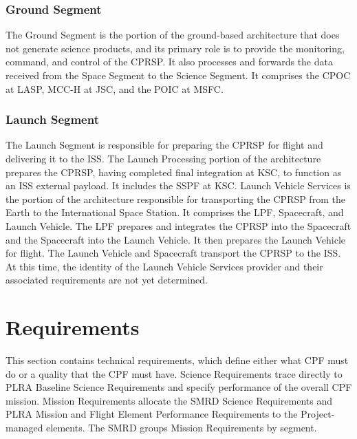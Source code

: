 \subsection{Ground Segment }
\label{groundsegment}

The Ground Segment is the portion of the ground-based architecture that does not generate science products, and its primary role is to provide the monitoring, command, and control of the \gls{CPRSP}. It also processes and forwards the data received from the Space Segment to the Science Segment. It comprises the \gls{CPOC} at \gls{LASP}, \gls{MCC-H} at \gls{JSC}, and the \gls{POIC} at \gls{MSFC}.

\subsection{Launch Segment }
\label{launchsegment}

The Launch Segment is responsible for preparing the \gls{CPRSP} for flight and delivering it to the \gls{ISS}. The Launch Processing portion of the architecture prepares the \gls{CPRSP}, having completed final integration at \gls{KSC}, to function as an \gls{ISS} external payload. It includes the \gls{SSPF} at \gls{KSC}. Launch Vehicle Services is the portion of the architecture responsible for transporting the \gls{CPRSP} from the Earth to the International Space Station. It comprises the \gls{LPF}, Spacecraft, and Launch Vehicle. The \gls{LPF} prepares and integrates the \gls{CPRSP} into the Spacecraft and the Spacecraft into the Launch Vehicle. It then prepares the Launch Vehicle for flight. The Launch Vehicle and Spacecraft transport the \gls{CPRSP} to the \gls{ISS}. At this time, the identity of the Launch Vehicle Services provider and their associated requirements are not yet determined.

\chapter{Requirements  }
\label{sec_req}

\renewcommand\labelitemi{}

This section contains technical requirements, which define either what \gls{CPF} must do or a quality that the \gls{CPF} must have. Science Requirements trace directly to PLRA Baseline Science Requirements and specify performance of the overall \gls{CPF} mission. Mission Requirements allocate the \gls{SMRD} Science Requirements and PLRA Mission and Flight Element Performance Requirements to the Project-managed elements. The \gls{SMRD} groups Mission Requirements by segment.

